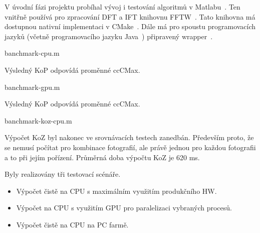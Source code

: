 V úvodní fázi projektu probíhal vývoj i testování algoritmů v Matlabu~\cite{matlab}. Ten vnitřně používá pro zpracování DFT a IFT knihovnu FFTW~\cite{fftw}. Tato knihovna má dostupnou nativní implementaci v CMake~\cite{cmake}. Dále má pro spoustu programovacích jazyků (včetně programovacího jazyku Java~\cite{FFT-java}) připravený wrapper~\cite{wrapper}.

banchmark-cpu.m


Výsledný KoP odpovídá proměnné ccCMax.

banchmark-gpu.m

Výsledný KoP odpovídá proměnné ccCMax.

banchmark-koz-cpu.m

Výpočet KoZ byl nakonec ve srovnávacích testech zanedbán. Především proto, že se nemusí počítat pro kombinace fotografií, ale právě jednou pro každou fotografii a to při jejím pořízení. Průměrná doba výpočtu KoZ je 620 ms.

Byly realizovány tři testovací scénáře.
\begin{itemize}
	\setlength{\parskip}{0pt}
	\setlength{\itemsep}{0pt}
	\item {Výpočet čistě na CPU s maximálním využitím produkčního HW.}
	\item {Výpočet na CPU s využitím GPU pro paralelizaci vybraných procesů.}
	\item {Výpočet čistě na CPU na PC farmě.}
\end{itemize}

